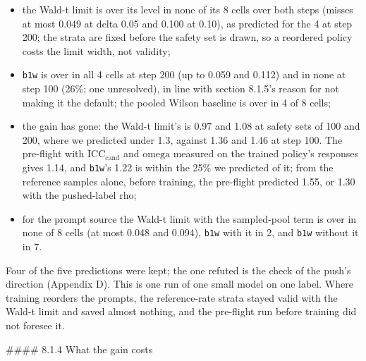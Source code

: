 \documentclass[11pt]{article}
\begin{document}
\begin{itemize}
\item the Wald-t limit is over its level in none of its 8 cells over both steps (misses at most 0.049 at delta 0.05 and 0.100 at 0.10), as predicted for the 4 at step 200; the strata are fixed before the safety set is drawn, so a reordered policy costs the limit width, not validity;
\item \texttt{b1w} is over in all 4 cells at step 200 (up to 0.059 and 0.112) and in none at step 100 (26\%; one unresolved), in line with section 8.1.5's reason for not making it the default; the pooled Wilson baseline is over in 4 of 8 cells;
\item the gain has gone: the Wald-t limit's is 0.97 and 1.08 at safety sets of 100 and 200, where we predicted under 1.3, against 1.36 and 1.46 at step 100. The pre-flight with $\mathrm{ICC}_{\mathrm{cand}}$ and $\text{omega}$ measured on the trained policy's responses gives 1.14, and \texttt{b1w}'s 1.22 is within the 25\% we predicted of it; from the reference samples alone, before training, the pre-flight predicted 1.55, or 1.30 with the pushed-label rho;
\item for the prompt source the Wald-t limit with the sampled-pool term is over in none of 8 cells (at most 0.048 and 0.094), \texttt{b1w} with it in 2, and \texttt{b1w} without it in 7.
\end{itemize}

Four of the five predictions were kept; the one refuted is the check of the push's direction (Appendix D). This is one run of one small model on one label. Where training reorders the prompts, the reference-rate strata stayed valid with the Wald-t limit and saved almost nothing, and the pre-flight run before training did not foresee it.


\#\#\#\# 8.1.4 What the gain costs
\end{document}
